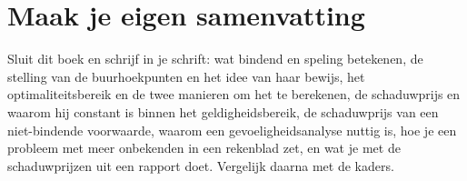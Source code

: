 \begin{oefeningen}





\end{oefeningen}


\ifzelfstudie
\section*{Maak je eigen samenvatting}
Sluit dit boek en schrijf in je schrift: wat bindend en speling betekenen, de stelling van de buurhoekpunten en het idee van haar bewijs, het optimaliteitsbereik en de twee manieren om het te berekenen, de schaduwprijs en waarom hij constant is binnen het geldigheidsbereik, de schaduwprijs van een niet-bindende voorwaarde, waarom een gevoeligheidsanalyse nuttig is, hoe je een probleem met meer onbekenden in een rekenblad zet, en wat je met de schaduwprijzen uit een rapport doet. Vergelijk daarna met de kaders.
\fi
